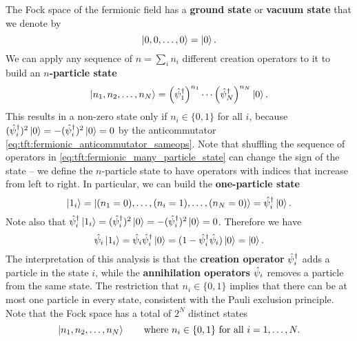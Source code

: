 The Fock space of the fermionic field has a \textbf{ground state} or \textbf{vacuum state} that we denote by
\begin{equation}
	\ket{0, 0, \ldots, 0} = \ket{0}. \\
\end{equation}
We can apply any sequence of $n = \sum_i n_i$ different creation operators to it to build an \textbf{$n$-particle state}
\begin{equation}
	\ket{n_1, n_2, \ldots, n_N} = \left( \hat\psi^\dagger_1 \right)^{n_1} \cdots \left( \hat\psi^\dagger_N \right)^{n_N} \ket{0} .
\label{eq:tft:fermionic_many_particle_state}
\end{equation}
This results in a non-zero state only if $n_i \in \{0, 1\}$ for all $i$, because $(\hat\psi^\dagger_i)^2 \ket{0} = -(\hat\psi^\dagger_i)^2 \ket{0} = 0$ by the anticommutator \eqref{eq:tft:fermionic_anticommutator_sameops}.
Note that shuffling the sequence of operators in \cref{eq:tft:fermionic_many_particle_state} can change the sign of the state -- we define the $n$-particle state to have operators with indices that increase from left to right.
In particular, we can build the \textbf{one-particle state}
\begin{equation}
	\ket{1_i} = \ket{(n_1=0), \ldots, (n_i=1), \ldots, (n_N=0)} = \hat\psi^\dagger_i \ket{0} .
\end{equation}
Note also that $\hat\psi^\dagger_i \ket{1_i} = (\hat\psi^\dagger_i)^2 \ket{0} = -(\hat\psi^\dagger_i)^2 \ket{0} = 0$.
Therefore we have
\begin{equation}
	\hat\psi_i \ket{1_i} = \hat\psi_i \hat\psi^\dagger_i \ket{0} = (1 - \hat\psi^\dagger_i \hat\psi_i) \ket{0} = \ket{0} .
\end{equation}
The interpretation of this analysis is that the \textbf{creation operator} $\hat\psi^\dagger_i$ adds a particle in the state $i$, while the \textbf{annihilation operators} $\hat\psi_i$ removes a particle from the same state.
The restriction that $n_i \in \{0, 1\}$ implies that there can be at most one particle in every state, consistent with the Pauli exclusion principle.
Note that the Fock space has a total of $2^N$ distinct states
\begin{equation}
	\ket{n_1, n_2, \ldots, n_N} \qquad \text{where } n_i \in \{0, 1\} \text{ for all } i = 1, \ldots, N .
\label{eq:tft:fermion_all_states}
\end{equation}

